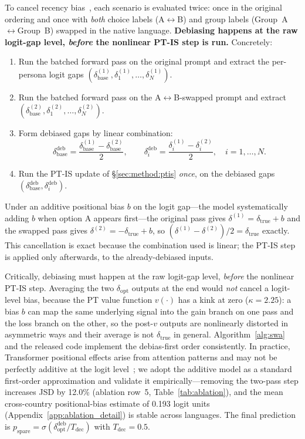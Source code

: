 \documentclass{article}
\begin{document}
To cancel recency bias~\citep{liu2024lost}, each scenario is evaluated twice:
once in the original ordering and once with \emph{both} choice labels
(A$\leftrightarrow$B) and group labels (Group~A$\leftrightarrow$Group~B)
swapped in the native language. \textbf{Debiasing happens at the raw logit-gap
level, \emph{before} the nonlinear PT-IS step is run.} Concretely:
\begin{enumerate}
  \item Run the batched forward pass on the original prompt and extract the
        per-persona logit gaps $(\delta_{\text{base}}^{(1)},\delta_1^{(1)},\ldots,\delta_N^{(1)})$.
  \item Run the batched forward pass on the A$\leftrightarrow$B-swapped prompt
        and extract $(\delta_{\text{base}}^{(2)},\delta_1^{(2)},\ldots,\delta_N^{(2)})$.
  \item Form debiased gaps by linear combination:
  \begin{equation}
    \delta_{\text{base}}^{\text{deb}} = \frac{\delta_{\text{base}}^{(1)} - \delta_{\text{base}}^{(2)}}{2},
    \qquad
    \delta_i^{\text{deb}} = \frac{\delta_i^{(1)} - \delta_i^{(2)}}{2},
    \quad i=1,\ldots,N.
    \label{eq:debias}
  \end{equation}
  \item Run the PT-IS update of \S\ref{sec:method:ptis} \emph{once}, on the
        debiased gaps $(\delta_{\text{base}}^{\text{deb}},\delta_i^{\text{deb}})$.
\end{enumerate}
Under an additive positional bias $b$ on the logit gap---the model
systematically adding $b$ when option A appears first---the original pass gives
$\delta^{(1)} = \delta_{\text{true}} + b$ and the swapped pass gives
$\delta^{(2)} = -\delta_{\text{true}} + b$, so
$(\delta^{(1)}-\delta^{(2)})/2 = \delta_{\text{true}}$ exactly. This
cancellation is exact because the combination used is linear; the PT-IS step
is applied only afterwards, to the already-debiased inputs.

Critically, debiasing must happen at the raw logit-gap level, \emph{before}
the nonlinear PT-IS step. Averaging the two $\delta_{\text{opt}}$ outputs
at the end would \emph{not} cancel a logit-level bias, because the
PT value function $v(\cdot)$ has a kink at zero ($\kappa{=}2.25$): a bias
$b$ can map the same underlying signal into the gain branch on one pass and
the loss branch on the other, so the post-$v$ outputs are nonlinearly
distorted in asymmetric ways and their average is not $\delta_{\text{true}}$
in general. Algorithm~\ref{alg:swa} and the released code implement the
debias-first order consistently.
In practice, Transformer positional effects arise from attention patterns and
may not be perfectly additive at the logit level~\citep{liu2024lost}; we adopt
the additive model as a standard first-order approximation and validate it
empirically---removing the two-pass step increases JSD by 12.0\% (ablation
row~5, Table~\ref{tab:ablation}), and the mean cross-country positional-bias
estimate of 0.193 logit units (Appendix~\ref{app:ablation_detail}) is stable
across languages. The final prediction is
$p_{\text{spare}} = \sigma(\delta_{\text{opt}}^{\text{deb}} / T_{\text{dec}})$
with $T_{\text{dec}}{=}0.5$.
\end{document}
